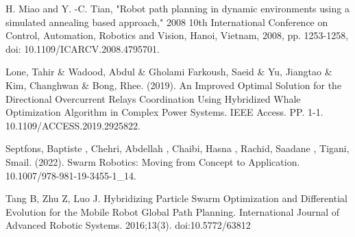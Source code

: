 \begin{thebibliography}{9}
H. Miao and Y. -C. Tian, "Robot path planning in dynamic environments using a simulated annealing based approach," 
2008 10th International Conference on Control, Automation, Robotics and Vision, Hanoi, Vietnam, 2008, pp. 1253-1258, 
doi: 10.1109/ICARCV.2008.4795701. 

Lone, Tahir \& Wadood, Abdul \& Gholami Farkoush, Saeid \& Yu, Jiangtao \& Kim, Changhwan \& Bong, Rhee. (2019). 
An Improved Optimal Solution for the Directional Overcurrent Relays Coordination Using Hybridized Whale Optimization Algorithm in Complex Power Systems. IEEE Access. PP. 1-1. 10.1109/ACCESS.2019.2925822. 

Septfons, Baptiste , Chehri, Abdellah , Chaibi, Hasna , Rachid, Saadane , Tigani, Smail. (2022). 
Swarm Robotics: Moving from Concept to Application. 10.1007/978-981-19-3455-1\_14.

Tang B, Zhu Z, Luo J. Hybridizing Particle Swarm Optimization and Differential Evolution for the Mobile Robot Global 
Path Planning. International Journal of Advanced Robotic Systems. 2016;13(3). doi:10.5772/63812

\end{thebibliography}



